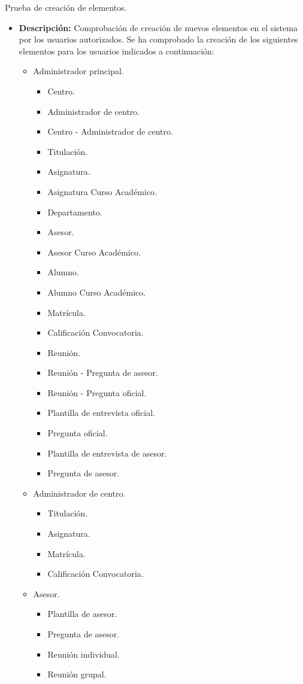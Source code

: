 \item Prueba de creación de elementos.
  \begin{itemize}
    \item \textbf{Descripción:} Comprobación de creación de nuevos elementos
    en el sistema por los usuarios autorizados. Se ha comprobado la creación de
    los siguientes elementos para los usuarios indicados a continuación:

    \begin{itemize}
      \item Administrador principal.
      \begin{itemize}
        \item Centro.
        \item Administrador de centro.
        \item Centro - Administrador de centro.
        \item Titulación.
        \item Asignatura.
        \item Asignatura Curso Académico.
        \item Departamento.
        \item Asesor.
        \item Asesor Curso Académico.
        \item Alumno.
        \item Alumno Curso Académico.
        \item Matrícula.
        \item Calificación Convocatoria.
        \item Reunión.
        \item Reunión - Pregunta de asesor.
        \item Reunión - Pregunta oficial.
        \item Plantilla de entrevista oficial.
        \item Pregunta oficial.
        \item Plantilla de entrevista de asesor.
        \item Pregunta de asesor.
      \end{itemize}
      \item Administrador de centro.
      \begin{itemize}
        \item Titulación.
        \item Asignatura.
        \item Matrícula.
        \item Calificación Convocatoria.
      \end{itemize}
      \item Asesor.
      \begin{itemize}
        \item Plantilla de asesor.
        \item Pregunta de asesor.
        \item Reunión individual.
        \item Reunión grupal.
      \end{itemize}
    \end{itemize}


\end{itemize}

